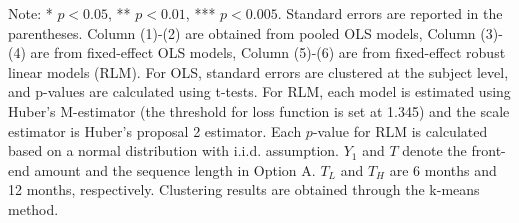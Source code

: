 \documentclass[12pt]{article}
\begin{document}
\begin{table}
    \vspace*{4pt}
    \centering
    \begin{minipage}{1.0\textwidth}
    {\par\footnotesize Note: * $p<0.05$, ** $p<0.01$, *** $p<0.005$. Standard errors are reported in the parentheses. Column (1)-(2) are obtained from pooled OLS models, Column (3)-(4) are from fixed-effect OLS models, Column (5)-(6) are from fixed-effect robust linear models (RLM). For OLS, standard errors are clustered at the subject level, and p-values are calculated using t-tests. For RLM, each model is estimated using Huber's M-estimator (the threshold for loss function is set at 1.345) and the scale estimator is Huber's proposal 2 estimator. Each $p$-value for RLM is calculated based on a normal distribution with i.i.d. assumption. $Y_1$ and $T$ denote the front-end amount and the sequence length in Option A. $T_L$ and $T_H$ are 6 months and 12 months, respectively. Clustering results are obtained through the k-means method.}
    \end{minipage}
    \label{tab:exp2_seq_value_reg}
\end{table}
\end{document}
